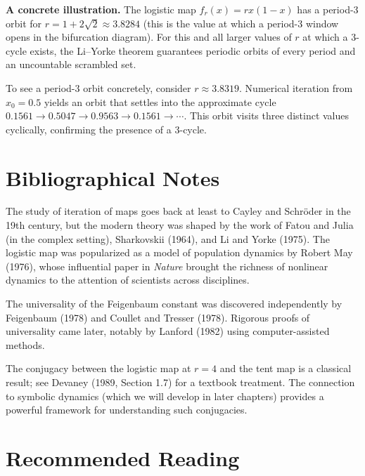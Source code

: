 \textbf{A concrete illustration.} The logistic map $f_r(x) = rx(1-x)$ has a period-3 orbit for $r = 1 + 2\sqrt{2} \approx 3.8284$ (this is the value at which a period-3 window opens in the bifurcation diagram). For this and all larger values of $r$ at which a 3-cycle exists, the Li--Yorke theorem guarantees periodic orbits of every period and an uncountable scrambled set.

To see a period-3 orbit concretely, consider $r \approx 3.8319$. Numerical iteration from $x_0 = 0.5$ yields an orbit that settles into the approximate cycle $0.1561 \to 0.5047 \to 0.9563 \to 0.1561 \to \cdots$. This orbit visits three distinct values cyclically, confirming the presence of a 3-cycle.


\section{Bibliographical Notes}\label{sec:2.9}

The study of iteration of maps goes back at least to Cayley and Schröder in the 19th century, but the modern theory was shaped by the work of Fatou and Julia (in the complex setting), Sharkovskii (1964), and Li and Yorke (1975). The logistic map was popularized as a model of population dynamics by Robert May (1976), whose influential paper in \textit{Nature} brought the richness of nonlinear dynamics to the attention of scientists across disciplines.

The universality of the Feigenbaum constant was discovered independently by Feigenbaum (1978) and Coullet and Tresser (1978). Rigorous proofs of universality came later, notably by Lanford (1982) using computer-assisted methods.

The conjugacy between the logistic map at $r = 4$ and the tent map is a classical result; see Devaney (1989, Section 1.7) for a textbook treatment. The connection to symbolic dynamics (which we will develop in later chapters) provides a powerful framework for understanding such conjugacies.


\section*{Recommended Reading}

